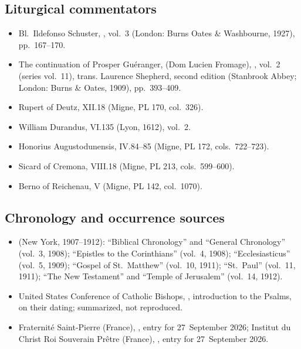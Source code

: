 {\subsection*{Liturgical commentators}
\begin{itemize}
\item Bl.\ Ildefonso Schuster, , vol.~3 (London: Burns Oates \& Washbourne, 1927), pp.~167--170.
\item The continuation of Prosper Guéranger,  (Dom Lucien Fromage), , vol.~2 (series vol.~11), trans. Laurence Shepherd, second edition (Stanbrook Abbey; London: Burns \& Oates, 1909), pp.~393--409.
\item Rupert of Deutz,  XII.18 (Migne, PL 170, col.~326).
\item William Durandus,  VI.135 (Lyon, 1612), vol.~2.
\item Honorius Augustodunensis,  IV.84--85 (Migne, PL 172, cols.~722--723).
\item Sicard of Cremona,  VIII.18 (Migne, PL 213, cols.~599--600).
\item Berno of Reichenau,  V (Migne, PL 142, col.~1070).
\end{itemize}

\subsection*{Chronology and occurrence sources}
\begin{itemize}
\item {} (New York, 1907--1912): ``Biblical Chronology'' and ``General Chronology'' (vol.~3, 1908); ``Epistles to the Corinthians'' (vol.~4, 1908); ``Ecclesiasticus'' (vol.~5, 1909); ``Gospel of St.\ Matthew'' (vol.~10, 1911); ``St.\ Paul'' (vol.~11, 1911); ``The New Testament'' and ``Temple of Jerusalem'' (vol.~14, 1912).
\item United States Conference of Catholic Bishops, , introduction to the Psalms, on their dating; summarized, not reproduced.
\item Fraternité Saint-Pierre (France), , entry for 27~September 2026; Institut du Christ Roi Souverain Prêtre (France), , entry for 27~September 2026.
\end{itemize}
\par}
